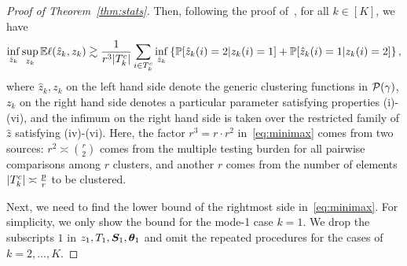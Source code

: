 \documentclass[lettersize,onecolumn,journal]{IEEEtran}
\theoremstyle{definition}
\theoremstyle{definition}
\begin{document}
\begin{proof}[Proof of Theorem~\ref{thm:stats}]
Then, following the proof of~\citet[Theorem 2]{gao2018community}, for all $k \in [K]$, we have
\begin{equation}\label{eq:minimax}
\inf_{\hat z_k}\sup_{z_k}\bbE \ell(\hat z_k, z_k) \gtrsim {1\over r^3 |T^c_k|}\sum_{i\in T^c_k}\inf_{\hat z_k}\left\{\bbP[\hat z_k(i)=2|z_k(i)=1] + \bbP[\hat z_k(i)=1|z_k(i)=2] \right\},
\end{equation}
where $\hat z_k, z_k$ on the left hand side denote the generic clustering functions in $\mathcal{P}(\gamma)$, $z_k$ on the right hand side denotes a particular parameter satisfying properties (i)-(vi), and the infimum on the right hand side is taken over the restricted family of $\hat z$ satisfying (iv)-(vi). Here, the factor $r^3=r\cdot r^2$ in~\eqref{eq:minimax} comes from two sources: $r^2\asymp {r\choose 2}$ comes from the multiple testing burden for all pairwise comparisons among $r$ clusters, and another $r$ comes from the number of elements $|T^c_k|\asymp {p\over r}$ to be clustered. 

Next, we need to find the lower bound of the rightmost side in~\eqref{eq:minimax}. For simplicity, we only show the bound for the mode-1 case $k = 1$. We drop the subscripts $1$ in $z_1, T_1, \bm S_1, \boldsymbol{\theta}_1$ and omit the repeated procedures for the cases of $k = 2,\ldots, K$. 


\end{proof}
\end{document}
